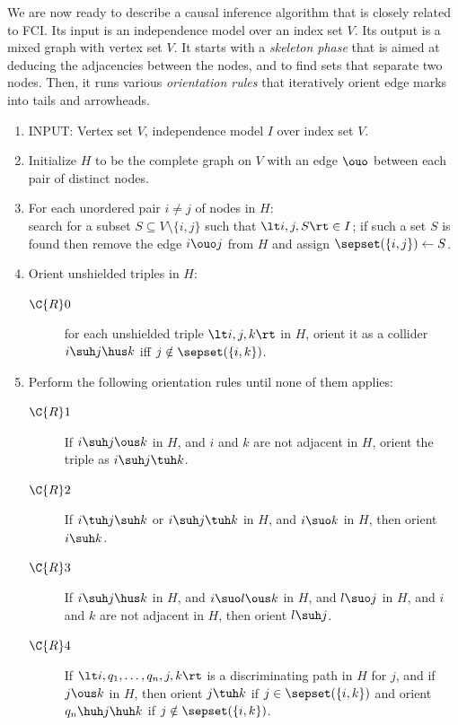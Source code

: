 We are now ready to describe a causal inference algorithm that is closely related to FCI.
Its input is an independence model over an index set $V$. Its output is a mixed graph with vertex set $V$.
It starts with a \emph{skeleton phase} that is aimed at deducing the adjacencies between the nodes, and to find sets that separate two nodes.
Then, it runs various \emph{orientation rules} that iteratively orient edge marks into tails and arrowheads.
\begin{enumerate}
  \item INPUT: Vertex set $V$, independence model $I$ over index set $V$.
  \item Initialize $H$ to be the complete graph on $V$ with an edge $\ouo$ between each pair of distinct nodes.
  \item For each unordered pair $i \ne j$ of nodes in $H$:\\
    search for a subset $S \subseteq V \setminus \{i,j\}$ such that $\lt i, j, S \rt \in I$;
    if such a set $S$ is found then remove the edge $i \ouo j$ from $H$ and assign $\sepset(\{i,j\}) \leftarrow S$.\label{alg:fci_skeleton}
  \item Orient unshielded triples in $H$:\label{alg:fci_R0}
    \begin{description}
    \item[$\C{R}0$] for each unshielded triple $\lt i,j,k \rt$ in $H$, orient it as a collider $i \suh j \hus k$ iff $j \notin \sepset(\{i,k\})$.
    \end{description}
  \item Perform the following orientation rules until none of them applies:
    \begin{description}
      \item[$\C{R}1$] If $i \suh j \ous k$ in $H$, and $i$ and $k$ are not adjacent in $H$, orient the triple as $i \suh j \tuh k$.
      \item[$\C{R}2$] If $i \tuh j \suh k$ or $i \suh j \tuh k$ in $H$, and $i \suo k$ in $H$, then orient $i \suh k$.
      \item[$\C{R}3$] If $i \suh j \hus k$ in $H$, and $i \suo l \ous k$ in $H$, and $l \suo j$ in $H$, and $i$ and $k$ are not adjacent in $H$, then orient $l \suh j$.
      \item[$\C{R}4$] If $\lt i, q_1, \dots, q_n, j, k \rt$ is a discriminating path in $H$ for $j$, and if $j \ous k$ in $H$, then orient $j \tuh k$ if $j \in \sepset(\{i,k\})$ and orient $q_n \huh j \huh k$ if $j \notin \sepset(\{i,k\})$.
    \end{description}

\end{enumerate}
